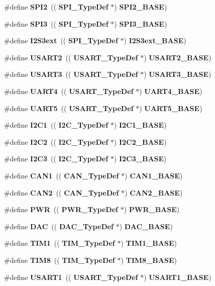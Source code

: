 \begin{DoxyCompactItemize}
\#define \textbf{ S\+P\+I2}~((\textbf{ S\+P\+I\+\_\+\+Type\+Def} $\ast$) \textbf{ S\+P\+I2\+\_\+\+B\+A\+SE})
\item 
\#define \textbf{ S\+P\+I3}~((\textbf{ S\+P\+I\+\_\+\+Type\+Def} $\ast$) \textbf{ S\+P\+I3\+\_\+\+B\+A\+SE})
\item 
\#define \textbf{ I2\+S3ext}~((\textbf{ S\+P\+I\+\_\+\+Type\+Def} $\ast$) \textbf{ I2\+S3ext\+\_\+\+B\+A\+SE})
\item 
\#define \textbf{ U\+S\+A\+R\+T2}~((\textbf{ U\+S\+A\+R\+T\+\_\+\+Type\+Def} $\ast$) \textbf{ U\+S\+A\+R\+T2\+\_\+\+B\+A\+SE})
\item 
\#define \textbf{ U\+S\+A\+R\+T3}~((\textbf{ U\+S\+A\+R\+T\+\_\+\+Type\+Def} $\ast$) \textbf{ U\+S\+A\+R\+T3\+\_\+\+B\+A\+SE})
\item 
\#define \textbf{ U\+A\+R\+T4}~((\textbf{ U\+S\+A\+R\+T\+\_\+\+Type\+Def} $\ast$) \textbf{ U\+A\+R\+T4\+\_\+\+B\+A\+SE})
\item 
\#define \textbf{ U\+A\+R\+T5}~((\textbf{ U\+S\+A\+R\+T\+\_\+\+Type\+Def} $\ast$) \textbf{ U\+A\+R\+T5\+\_\+\+B\+A\+SE})
\item 
\#define \textbf{ I2\+C1}~((\textbf{ I2\+C\+\_\+\+Type\+Def} $\ast$) \textbf{ I2\+C1\+\_\+\+B\+A\+SE})
\item 
\#define \textbf{ I2\+C2}~((\textbf{ I2\+C\+\_\+\+Type\+Def} $\ast$) \textbf{ I2\+C2\+\_\+\+B\+A\+SE})
\item 
\#define \textbf{ I2\+C3}~((\textbf{ I2\+C\+\_\+\+Type\+Def} $\ast$) \textbf{ I2\+C3\+\_\+\+B\+A\+SE})
\item 
\#define \textbf{ C\+A\+N1}~((\textbf{ C\+A\+N\+\_\+\+Type\+Def} $\ast$) \textbf{ C\+A\+N1\+\_\+\+B\+A\+SE})
\item 
\#define \textbf{ C\+A\+N2}~((\textbf{ C\+A\+N\+\_\+\+Type\+Def} $\ast$) \textbf{ C\+A\+N2\+\_\+\+B\+A\+SE})
\item 
\#define \textbf{ P\+WR}~((\textbf{ P\+W\+R\+\_\+\+Type\+Def} $\ast$) \textbf{ P\+W\+R\+\_\+\+B\+A\+SE})
\item 
\#define \textbf{ D\+AC}~((\textbf{ D\+A\+C\+\_\+\+Type\+Def} $\ast$) \textbf{ D\+A\+C\+\_\+\+B\+A\+SE})
\item 
\#define \textbf{ T\+I\+M1}~((\textbf{ T\+I\+M\+\_\+\+Type\+Def} $\ast$) \textbf{ T\+I\+M1\+\_\+\+B\+A\+SE})
\item 
\#define \textbf{ T\+I\+M8}~((\textbf{ T\+I\+M\+\_\+\+Type\+Def} $\ast$) \textbf{ T\+I\+M8\+\_\+\+B\+A\+SE})
\item 
\#define \textbf{ U\+S\+A\+R\+T1}~((\textbf{ U\+S\+A\+R\+T\+\_\+\+Type\+Def} $\ast$) \textbf{ U\+S\+A\+R\+T1\+\_\+\+B\+A\+SE})

\end{DoxyCompactItemize}
